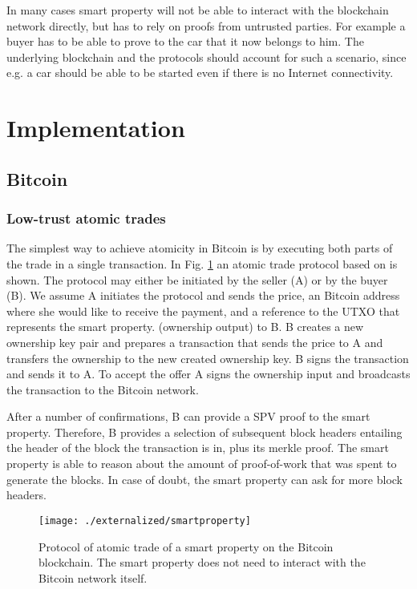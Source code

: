 In many cases smart property will not be able to interact with the blockchain network directly, but has to rely on proofs from untrusted parties. For example a buyer has to be able to prove to the car that it now belongs to him. The underlying blockchain and the protocols should account for such a scenario, since e.g. a car should be able to be started even if there is no Internet connectivity. 


\section{Implementation}

\subsection{Bitcoin}

\subsubsection{Low-trust atomic trades}

The simplest way to achieve atomicity in Bitcoin is by executing both parts of the trade in a single transaction. In Fig. \ref{fig:smartproperty} an atomic trade protocol based on \cite{smartproperty2011} is shown. The protocol may either be initiated by the seller (A) or by the buyer (B). We assume A initiates the protocol and sends the price, an Bitcoin address where she would like to receive the payment, and a reference to the UTXO that represents the smart property. (ownership output) to B. B creates a new ownership key pair and prepares a transaction that sends the price to A and transfers the ownership to the new created ownership key. B signs the transaction and sends it to A. To accept the offer A signs the ownership input and broadcasts the transaction to the Bitcoin network. 

After a number of confirmations, B can provide a SPV proof to the smart property. Therefore, B provides a selection of subsequent block headers entailing the header of the block the transaction is in, plus its merkle proof. The smart property is able to reason about the amount of proof-of-work that was spent to generate the blocks. In case of doubt, the smart property can ask for more block headers.

\begin{figure}[!t]
    \centering
    \texttt{[image: ./externalized/smartproperty]}
    \caption{Protocol of atomic trade of a smart property on the Bitcoin blockchain. The smart property does not need to interact with the Bitcoin network itself.}
    \label{fig:smartproperty}
  \end{figure}

